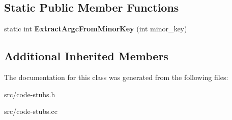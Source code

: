 \subsection*{Static Public Member Functions}
\begin{DoxyCompactItemize}
\item 
\hypertarget{classv8_1_1internal_1_1_call_function_stub_aeb724203baf486956699f6567b827ab8}{}static int {\bfseries Extract\+Argc\+From\+Minor\+Key} (int minor\+\_\+key)\label{classv8_1_1internal_1_1_call_function_stub_aeb724203baf486956699f6567b827ab8}

\end{DoxyCompactItemize}
\subsection*{Additional Inherited Members}


The documentation for this class was generated from the following files\+:\begin{DoxyCompactItemize}
\item 
src/code-\/stubs.\+h\item 
src/code-\/stubs.\+cc\end{DoxyCompactItemize}
